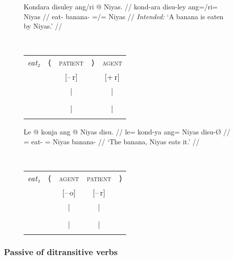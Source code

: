 \begin{figure}
\pex\label{ex:passzn2}
\a\label{ex:passzn2_inst}%
\ljudge*%
\begin{minipage}[t]{.5\remaining}
\begingl
	\gla Kondara disuley ang/ri @ Niyas. //
	\glb kond-ara disu-ley ang=/ri= Niyas //
	\glc eat-\TsgI{} banana-\PargI{} \Aarg{}=/\Ins{}= Niyas //
	\glft \textit{Intended:} `A banana is eaten by Niyas.' //
\endgl
\end{minipage}
~
\begin{tabular}[t]{>{\itshape}l l c r c}
eat₂
	& ⟨
	& \textsc{patient}
	& ⟩
	& \textsc{agent}
	\\
%
	& %
	& [–\,r]
	& %
	& [+\,r]
	\\

%
	& %
	& |
	& %
	& |
	\\

%
	& %
	& \Subj
	& %
	& \Oblq{agt}
	\\

%
	& %
	& |
	& %
	& |
	\\

%
	& %
	& \fw{banana}
	& %
	& \fw{Niyas}
	\\
\end{tabular}

\a\label{ex:passzn2_pt}%
\begin{minipage}[t]{.5\remaining}
\begingl
	\gla Le @ konja ang @ Niyas disu. //
	\glb le= kond-ya ang= Niyas disu-Ø //
	\glc \PatT{}= eat-\TsgM{} \Aarg{}= Niyas banana-\Top{} //
	\glft `The banana, Niyas eats it.' //
\endgl
\end{minipage}
~
\begin{tabular}[t]{>{\itshape}l l c c r}
eat₁
	& ⟨
	& \textsc{agent}
	& \textsc{patient}
	& ⟩
	\\
%
	& %
	& [–\,o]
	& [–\,r]
	& %
	\\

%
	& %
	& |
	& |
	& %
	\\

%
	& %
	& \Subj
	& \Obj*
	& %
	\\

%
	& %
	& |
	& |
	& %
	\\

%
	& %
	& \fw{Niyas}
	& \fw{banana}
	& %
	\\
\end{tabular}

\xe
\end{figure}

\subsubsection{Passive of ditransitive verbs}

